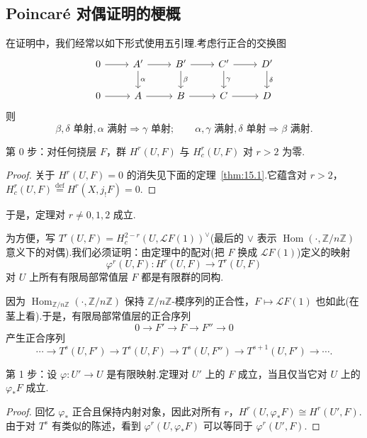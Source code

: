 \subsection*{Poincar\'e 对偶证明的梗概}

在证明中，我们经常以如下形式使用五引理.考虑行正合的交换图
\[
\begin{tikzcd}
0 \arrow[r] & A' \arrow[r] \arrow[d, "\alpha"] & B' \arrow[r] \arrow[d, "\beta"] & C' \arrow[r] \arrow[d, "\gamma"] & D' \arrow[d, "\delta"] \\
0 \arrow[r] & A \arrow[r] & B \arrow[r] & C \arrow[r] & D
\end{tikzcd}
\]
则
\[
\beta, \delta \text{ 单射}, \alpha \text{ 满射} \Rightarrow \gamma \text{ 单射};
\qquad
\alpha, \gamma \text{ 满射}, \delta \text{ 单射} \Rightarrow \beta \text{ 满射}.
\]

第 0 步：对任何挠层 $F$，群 $H^{r}(U, F)$ 与 $H^{r}_{c}(U, F)$ 对 $r > 2$ 为零.

\begin{proof}
关于 $H^{r}(U, F) = 0$ 的消失见下面的定理~\ref{thm:15.1}.它蕴含对 $r > 2$，$H^{r}_{c}(U, F) \overset{\mathrm{def}}{=} H^{r}(X, j_{!}F) = 0$.
\end{proof}

于是，定理对 $r \neq 0, 1, 2$ 成立.

为方便，写 $T^{r}(U, F) = H^{2-r}_{c}(U, \mathcal{L}F(1))^{\vee}$(最后的 $\vee$ 表示 $\operatorname{Hom}(\cdot, \mathbb{Z}/n\mathbb{Z})$ 意义下的对偶).我们必须证明：由定理中的配对(把 $F$ 换成 $\mathcal{L}F(1)$)定义的映射
\[
\varphi^{r}(U, F) \colon H^{r}(U, F) \to T^{r}(U, F)
\]
对 $U$ 上所有有限局部常值层 $F$ 都是有限群的同构.

因为 $\operatorname{Hom}_{\mathbb{Z}/n\mathbb{Z}}(\cdot, \mathbb{Z}/n\mathbb{Z})$ 保持 $\mathbb{Z}/n\mathbb{Z}$-模序列的正合性，$F \mapsto \mathcal{L}F(1)$ 也如此(在茎上看).于是，有限局部常值层的正合序列
\[
0 \to F' \to F \to F'' \to 0
\]
产生正合序列
\[
\cdots \to T^{s}(U, F') \to T^{s}(U, F) \to T^{s}(U, F'') \to T^{s+1}(U, F') \to \cdots.
\]

第 1 步：设 $\varphi \colon U' \to U$ 是有限映射.定理对 $U'$ 上的 $F$ 成立，当且仅当它对 $U$ 上的 $\varphi_{*}F$ 成立.

\begin{proof}
回忆 $\varphi_{*}$ 正合且保持内射对象，因此对所有 $r$，$H^{r}(U, \varphi_{*}F) \cong H^{r}(U', F)$.由于对 $T^{s}$ 有类似的陈述，看到 $\varphi^{r}(U, \varphi_{*}F)$ 可以等同于 $\varphi^{r}(U', F)$.
\end{proof}

